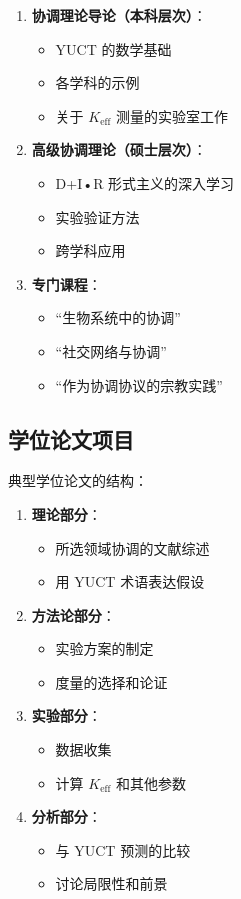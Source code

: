 \documentclass[12pt,a4paper]{article}
\begin{document}
	\begin{enumerate}
		\item \textbf{协调理论导论（本科层次）}：
		\begin{itemize}
			\item YUCT 的数学基础
			\item 各学科的示例
			\item 关于 $K_{\mathrm{eff}}$ 测量的实验室工作
		\end{itemize}
		
		\item \textbf{高级协调理论（硕士层次）}：
		\begin{itemize}
			\item D+I•R 形式主义的深入学习
			\item 实验验证方法
			\item 跨学科应用
		\end{itemize}
		
		\item \textbf{专门课程}：
		\begin{itemize}
			\item “生物系统中的协调”
			\item “社交网络与协调”
			\item “作为协调协议的宗教实践”
		\end{itemize}
	\end{enumerate}
	
	\subsection{学位论文项目}
	
	典型学位论文的结构：
	\begin{enumerate}
		\item \textbf{理论部分}：
		\begin{itemize}
			\item 所选领域协调的文献综述
			\item 用 YUCT 术语表达假设
		\end{itemize}
		
		\item \textbf{方法论部分}：
		\begin{itemize}
			\item 实验方案的制定
			\item 度量的选择和论证
		\end{itemize}
		
		\item \textbf{实验部分}：
		\begin{itemize}
			\item 数据收集
			\item 计算 $K_{\mathrm{eff}}$ 和其他参数
		\end{itemize}
		
		\item \textbf{分析部分}：
		\begin{itemize}
			\item 与 YUCT 预测的比较
			\item 讨论局限性和前景
		\end{itemize}
	\end{enumerate}
	
\end{document}
